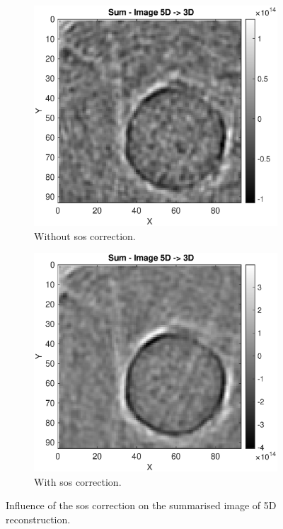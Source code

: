 \begin{figure}[H]
     \centering
     \begin{subfigure}[b]{0.47\textwidth}
                  \centering
         \includegraphics[width=1.09\textwidth]{Graphics/Results/14_vecs_sos_vs_noSos/sum_14vecs_no_sos_z_direction.eps}
         \caption{Without \ac{sos} correction.}
         \label{sos:influence_sum_images_without}
     \end{subfigure}
     \hfill
     \begin{subfigure}[b]{0.47\textwidth}
         \centering
         \includegraphics[width=1.09\linewidth]{Graphics/Results/14_vecs_sos_vs_noSos/sum_14vecs_with_sos_z_direction.eps}
         \caption{With \ac{sos} correction. }
         \label{sos:influence_sum_images_with}
     \end{subfigure}
        \caption{Influence of the \ac{sos} correction on the summarised image of 5D reconstruction.}
        \label{sos:influence_sum_images}
\end{figure}


